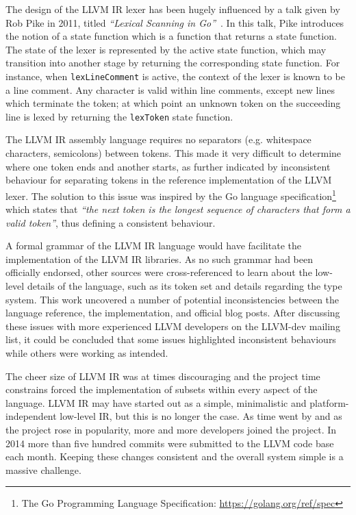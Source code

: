 The design of the LLVM IR lexer has been hugely influenced by a talk given by Rob Pike in 2011, titled \textit{``Lexical Scanning in Go''}~\cite{lexical_scanning_in_go}. In this talk, Pike introduces the notion of a state function which is a function that returns a state function. The state of the lexer is represented by the active state function, which may transition into another stage by returning the corresponding state function. For instance, when \texttt{lexLineComment} is active, the context of the lexer is known to be a line comment. Any character is valid within line comments, except new lines which terminate the token; at which point an unknown token on the succeeding line is lexed by returning the \texttt{lexToken} state function.

The LLVM IR assembly language requires no separators (e.g. whitespace characters, semicolons) between tokens. This made it very difficult to determine where one token ends and another starts, as further indicated by inconsistent behaviour for separating tokens in the reference implementation of the LLVM lexer. The solution to this issue was inspired by the Go language specification\footnote{The Go Programming Language Specification: \url{https://golang.org/ref/spec}} which states that \textit{``the next token is the longest sequence of characters that form a valid token''}, thus defining a consistent behaviour.

A formal grammar of the LLVM IR language would have facilitate the implementation of the LLVM IR libraries. As no such grammar had been officially endorsed, other sources were cross-referenced to learn about the low-level details of the language, such as its token set and details regarding the type system. This work uncovered a number of potential inconsistencies between the language reference, the implementation, and official blog posts. After discussing these issues with more experienced LLVM developers on the LLVM-dev mailing list, it could be concluded that some issues highlighted inconsistent behaviours while others were working as intended.

The cheer size of LLVM IR was at times discouraging and the project time constrains forced the implementation of subsets within every aspect of the language. LLVM IR may have started out as a simple, minimalistic and platform-independent low-level IR, but this is no longer the case. As time went by and as the project rose in popularity, more and more developers joined the project. In 2014 more than five hundred commits were submitted to the LLVM code base each month. Keeping these changes consistent and the overall system simple is a massive challenge.

